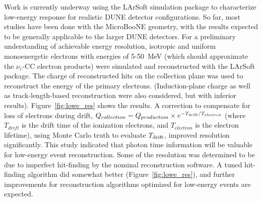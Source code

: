 Work is currently underway using the LArSoft simulation package
to characterize low-energy
response for realistic DUNE detector configurations.
So far,
most studies have been done with the MicroBooNE geometry, with the
results expected to be %
generally applicable to the larger DUNE detectors.  For a preliminary
understanding of achievable energy resolution, isotropic and uniform
monoenergetic electrons with energies of 5-50~MeV (which should
approximate the $\nu_e$-CC electron products) were simulated and
reconstructed with the LArSoft
package. 
The charge of reconstructed hits on the collection plane was used to
reconstruct the energy of the primary electrons. (Induction-plane charge
as well as track-length-based reconstruction were also considered, but
with inferior results). Figure~\ref{fig:lowe_res} shows the results.
A correction to compensate for loss of electrons during drift,
$Q_{collection}=Q_{production}\times e^{-T_{\rm drift} / T_{\rm
    electron}}$ (where $T_{drift}$ is the drift time of the ionization
electrons, and $T_{electron}$ is the electron lifetime), using Monte
Carlo truth to evaluate $T_{\rm drift}$, improved resolution
significantly.  This study indicated that photon time information will
be valuable for low-energy event reconstruction.  Some of the
resolution was determined to be due to imperfect hit-finding by the
nominal reconstruction software.  A tuned hit-finding algorithm did
somewhat better (Figure~\ref{fig:lowe_res}), and further
improvements for reconstruction algorithms optimized for low-energy
events are expected.
%
